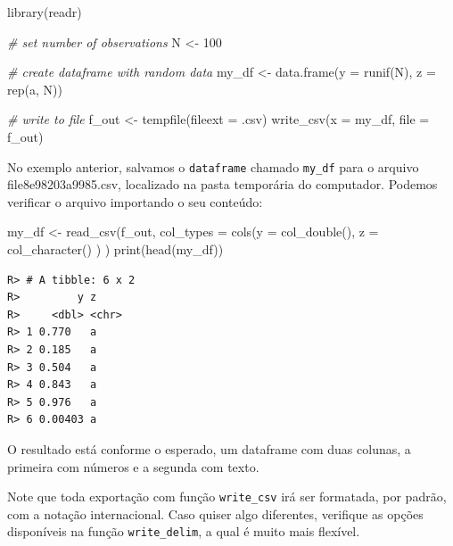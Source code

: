 \documentclass[
  11pt,
]{book}
\newenvironment{Shaded}{\begin{snugshade}}{\end{snugshade}}
\newcommand{\AttributeTok}[1]{\textcolor[rgb]{0.61,0.61,0.61}{#1}}
\newcommand{\CommentTok}[1]{\textcolor[rgb]{0.37,0.37,0.37}{\textit{#1}}}
\newcommand{\DecValTok}[1]{\textcolor[rgb]{0.06,0.06,0.06}{#1}}
\newcommand{\FunctionTok}[1]{\textcolor[rgb]{0,0,0}{#1}}
\newcommand{\NormalTok}[1]{#1}
\newcommand{\OtherTok}[1]{\textcolor[rgb]{0.37,0.37,0.37}{#1}}
\newcommand{\StringTok}[1]{\textcolor[rgb]{0.5,0.5,0.5}{#1}}
\begin{document}
\begin{Shaded}
\begin{Highlighting}[]
\FunctionTok{library}\NormalTok{(readr)}

\CommentTok{\# set number of observations}
\NormalTok{N }\OtherTok{\textless{}{-}} \DecValTok{100}

\CommentTok{\# create dataframe with random data}
\NormalTok{my\_df }\OtherTok{\textless{}{-}} \FunctionTok{data.frame}\NormalTok{(}\AttributeTok{y =} \FunctionTok{runif}\NormalTok{(N),}
                    \AttributeTok{z =} \FunctionTok{rep}\NormalTok{(}\StringTok{\textquotesingle{}a\textquotesingle{}}\NormalTok{, N))}

\CommentTok{\# write to file}
\NormalTok{f\_out }\OtherTok{\textless{}{-}} \FunctionTok{tempfile}\NormalTok{(}\AttributeTok{fileext =} \StringTok{\textquotesingle{}.csv\textquotesingle{}}\NormalTok{)}
\FunctionTok{write\_csv}\NormalTok{(}\AttributeTok{x =}\NormalTok{ my\_df, }\AttributeTok{file =}\NormalTok{ f\_out)}
\end{Highlighting}
\end{Shaded}

No exemplo anterior, salvamos o \texttt{dataframe} chamado \texttt{my\_df} para o arquivo file8e98203a9985.csv, localizado na pasta temporária do computador. Podemos verificar o arquivo importando o seu conteúdo:

\begin{Shaded}
\begin{Highlighting}[]
\NormalTok{my\_df }\OtherTok{\textless{}{-}} \FunctionTok{read\_csv}\NormalTok{(f\_out,}
                  \AttributeTok{col\_types =} \FunctionTok{cols}\NormalTok{(}\AttributeTok{y =} \FunctionTok{col\_double}\NormalTok{(),}
                                   \AttributeTok{z =} \FunctionTok{col\_character}\NormalTok{() ) )}
\FunctionTok{print}\NormalTok{(}\FunctionTok{head}\NormalTok{(my\_df))}
\end{Highlighting}
\end{Shaded}

\begin{verbatim}
R> # A tibble: 6 x 2
R>         y z    
R>     <dbl> <chr>
R> 1 0.770   a    
R> 2 0.185   a    
R> 3 0.504   a    
R> 4 0.843   a    
R> 5 0.976   a    
R> 6 0.00403 a
\end{verbatim}

O resultado está conforme o esperado, um dataframe com duas colunas, a primeira com números e a segunda com texto.

Note que toda exportação com função \texttt{write\_csv} irá ser formatada, por padrão, com a notação internacional. Caso quiser algo diferentes, verifique as opções disponíveis na função \texttt{write\_delim}, a qual é muito mais flexível.
\end{document}
